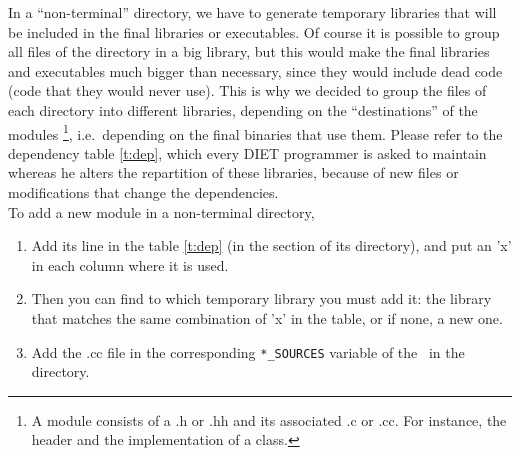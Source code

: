 In a ``non-terminal'' directory, we have to generate temporary
libraries that will be included in the final libraries
or executables. Of course it is possible to group all files of the
directory in a big library, but this would make the final libraries
and executables much bigger than necessary, since they would include
dead code (code that they would never use).
This is why we decided to group the files of each directory into
different libraries, depending on the ``destinations''
of the modules
\footnote{A module consists of a \textsf{.h} or
\textsf{.hh} and its associated \textsf{.c} or \textsf{.cc}.
For instance, the header and the implementation of a class.},
i.e.~depending on the final binaries that use them.
Please refer to the dependency table \ref{t:dep}, which every
DIET programmer is asked to maintain whereas he alters the repartition
of these libraries, because of new files or modifications that
change the dependencies.  \\

\noindent
To add a new module in a non-terminal directory,
\begin{enumerate}
\item Add its line in the table \ref{t:dep} (in the section of its
  directory), and put an 'x' in each column where it is used.
\item Then you can find to which temporary library you must add it:
  the library that matches the same combination of 'x' in the table,
  or if none, a new one.
\item Add the \textsf{.cc} file in the corresponding
  \texttt{*\_SOURCES} variable of the \CMakeLists\ in the directory.
\end{enumerate}

